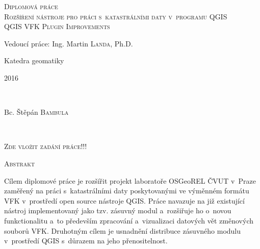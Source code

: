 \documentclass[a4paper,12pt,oneside]{book}
\begin{document}
\begin{titlepage}
\textsc{\Large Diplomová práce}\\
\vfill
\textsc{\LARGE  Rozšíření nástroje pro práci s~katastrálními daty v~programu QGIS}\\[0.5cm] %

\textsc{\Large QGIS VFK Plugin Improvements}
 
 
 \vfill
\large Vedoucí práce: Ing. Martin \textsc{Landa}, Ph.D.

Katedra geomatiky
 
\vfill
\begin{minipage}{0.4\textwidth}
\begin{flushleft} 
\large 2016	%
\end{flushleft}
\end{minipage}
~
\begin{minipage}{0.4\textwidth}
\begin{flushright} 
\large Bc. Štěpán \textsc{Bambula} \\ %
\end{flushright}
\end{minipage}\\[1cm]
 
\end{titlepage}

\clearpage
\pagestyle{empty}

\vspace*{\fill}
\begin{center}
\textsc{\Large Zde vložit zadání práce!!!}
\end{center}

\vspace*{\fill}

\clearpage

\hfill

\noindent
\textsc{\Large Abstrakt}

\vspace{12pt}

Cílem diplomové práce je rozšířit projekt laboratoře OSGeoREL ČVUT v~Praze zaměřený na práci s~katastrálními daty poskytovanými ve výměnném formátu VFK v~prostředí open source nástroje QGIS. Práce navazuje na již existující nástroj implementovaný jako tzv. zásuvný modul a~rozšiřuje ho o~novou funkctionalitu a~to především zpracování a~vizualizaci datových vět změnových souborů VFK. Druhotným cílem je usnadnění distribuce zásuvného modulu v~prostředí QGIS s~důrazem na jeho přenositelnost.
\end{document}

